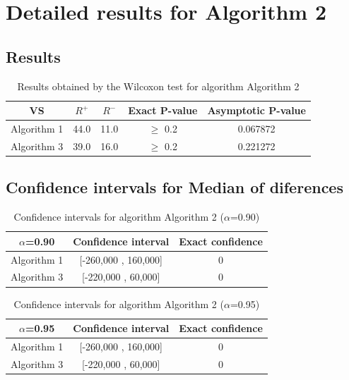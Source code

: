 \documentclass[a4paper,10pt]{article}
\begin{document}
 \clearpage 


\section{Detailed results for Algorithm 2}


\subsection{Results}

\begin{table}[!htp]
\centering\small
\begin{tabular}{
|c|c|c|c|c|}
\hline
 VS & $R^{+}$ & $R^{-}$ & Exact P-value & Asymptotic P-value \\ \hline 
Algorithm 1 & 44.0 & 11.0 & $\geq$ 0.2 & 0.067872\\ \hline 
Algorithm 3 & 39.0 & 16.0 & $\geq$ 0.2 & 0.221272\\ \hline 

\end{tabular}
\caption{Results obtained by the Wilcoxon test for algorithm Algorithm 2}
\end{table}

\subsection{Confidence intervals for Median of diferences}

\begin{table}[!htp]
\centering\small
\begin{tabular}{
|c|c|c|}
\hline
 $\alpha$=0.90 & Confidence interval & Exact confidence \\ \hline 
Algorithm 1 & [-260,000 , 160,000] & 0\\ \hline 
Algorithm 3 & [-220,000 , 60,000] & 0\\ \hline 

\end{tabular}
\caption{Confidence intervals for algorithm Algorithm 2 ($\alpha$=0.90)}
\end{table}
\begin{table}[!htp]
\centering\small
\begin{tabular}{
|c|c|c|}
\hline
 $\alpha$=0.95 & Confidence interval & Exact confidence \\ \hline 
Algorithm 1 & [-260,000 , 160,000] & 0\\ \hline 
Algorithm 3 & [-220,000 , 60,000] & 0\\ \hline 

\end{tabular}
\caption{Confidence intervals for algorithm Algorithm 2 ($\alpha$=0.95)}
\end{table}
\end{document}
